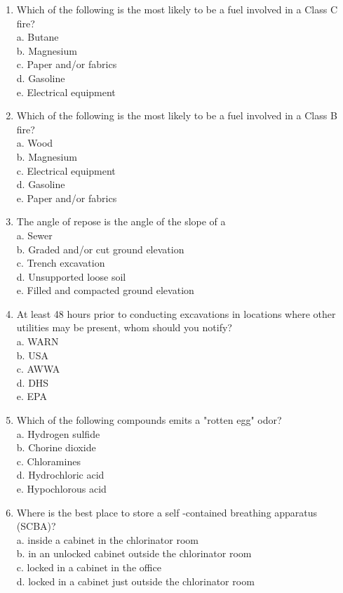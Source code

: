 \documentclass{article}
\begin{document}
\begin{enumerate}
\item Which of the following is the most likely to be a fuel involved in a Class C fire?\\
a. Butane\\
b. Magnesium\\
c. Paper and/or fabrics\\
d. Gasoline\\
e. Electrical equipment\\
  \item Which of the following is the most likely to be a fuel involved in a Class B fire?\\
a. Wood\\
b. Magnesium\\
c. Electrical equipment\\
d. Gasoline\\
e. Paper and/or fabrics\\

\item The angle of repose is the angle of the slope of a\\
a. Sewer\\
b. Graded and/or cut ground elevation\\
c. Trench excavation\\
d. Unsupported loose soil\\
e. Filled and compacted ground elevation\\

\item At least 48 hours prior to conducting excavations in locations where other utilities may be present, whom should you notify?\\
a. WARN\\
b. USA\\
c. AWWA\\
d. DHS\\
e. EPA\\

\item Which of the following compounds emits a "rotten egg" odor?\\
a. Hydrogen sulfide\\
b. Chorine dioxide\\
c. Chloramines\\
d. Hydrochloric acid\\
e. Hypochlorous acid\\

\item Where is the best place to store a self -contained breathing apparatus (SCBA)?\\
a.	inside a cabinet in the chlorinator room\\
b.	in  an unlocked cabinet outside the chlorinator room\\
c.	locked in a cabinet in the office\\
d.	locked in a cabinet just outside the chlorinator room\\


\end{enumerate}
\end{document}
